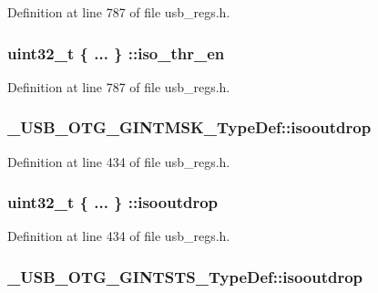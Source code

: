 Definition at line 787 of file usb\-\_\-regs.\-h.

\hypertarget{group___u_s_b___o_t_g___d_r_i_v_e_r_ga74b032b19f1244a8fb88a71aa12d520f}{
\subsubsection[{iso\-\_\-thr\-\_\-en}]{\setlength{\rightskip}{0pt plus 5cm}uint32\-\_\-t \{ ... \} \-::iso\-\_\-thr\-\_\-en}}\label{group___u_s_b___o_t_g___d_r_i_v_e_r_ga74b032b19f1244a8fb88a71aa12d520f}


Definition at line 787 of file usb\-\_\-regs.\-h.

\hypertarget{group___u_s_b___o_t_g___d_r_i_v_e_r_gadcb6c03184ea4654f1333089771c13e9}{
\subsubsection[{isooutdrop}]{ \-\_\-\-U\-S\-B\-\_\-\-O\-T\-G\-\_\-\-G\-I\-N\-T\-M\-S\-K\-\_\-\-Type\-Def\-::isooutdrop}}\label{group___u_s_b___o_t_g___d_r_i_v_e_r_gadcb6c03184ea4654f1333089771c13e9}


Definition at line 434 of file usb\-\_\-regs.\-h.

\hypertarget{group___u_s_b___o_t_g___d_r_i_v_e_r_gaa7f3acd51dfbb848cdf7778cd373cc4b}{
\subsubsection[{isooutdrop}]{\setlength{\rightskip}{0pt plus 5cm}uint32\-\_\-t \{ ... \} \-::isooutdrop}}\label{group___u_s_b___o_t_g___d_r_i_v_e_r_gaa7f3acd51dfbb848cdf7778cd373cc4b}


Definition at line 434 of file usb\-\_\-regs.\-h.

\hypertarget{group___u_s_b___o_t_g___d_r_i_v_e_r_ga3bff231b75a5c9d6da76f7f5188bf655}{
\subsubsection[{isooutdrop}]{ \-\_\-\-U\-S\-B\-\_\-\-O\-T\-G\-\_\-\-G\-I\-N\-T\-S\-T\-S\-\_\-\-Type\-Def\-::isooutdrop}}\label{group___u_s_b___o_t_g___d_r_i_v_e_r_ga3bff231b75a5c9d6da76f7f5188bf655}


